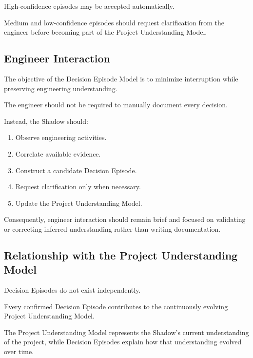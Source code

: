 High-confidence episodes may be accepted automatically.

Medium and low-confidence episodes should request clarification from the engineer before becoming part of the Project Understanding Model.

\vspace{0.5cm}

\subsection{Engineer Interaction}

The objective of the Decision Episode Model is to minimize interruption while preserving engineering understanding.

The engineer should not be required to manually document every decision.

Instead, the Shadow should:

\begin{enumerate}
    \item Observe engineering activities.
    \item Correlate available evidence.
    \item Construct a candidate Decision Episode.
    \item Request clarification only when necessary.
    \item Update the Project Understanding Model.
\end{enumerate}

Consequently, engineer interaction should remain brief and focused on validating or correcting inferred understanding rather than writing documentation.

\vspace{0.5cm}

\subsection{Relationship with the Project Understanding Model}

Decision Episodes do not exist independently.

Every confirmed Decision Episode contributes to the continuously evolving Project Understanding Model.

The Project Understanding Model represents the Shadow's current understanding of the project, while Decision Episodes explain how that understanding evolved over time.

\vspace{0.5cm}

